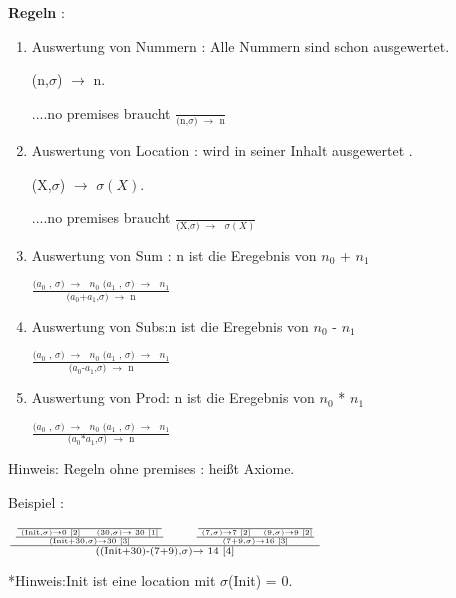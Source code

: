 \documentclass[a4paper,12pt,twoside,headsepline]{scrartcl}
\begin{document}
\textbf{Regeln} :\begin{enumerate}

\item  Auswertung von Nummern : Alle Nummern sind schon ausgewertet.\label{1}
\begin{center}
(n,$\sigma$) $\to$ n.    

 ....no premises braucht   $\frac{ } {\text{(n,$\sigma$) $\to$ n}}$
\end{center}  
\item Auswertung von Location : wird in seiner Inhalt ausgewertet .\label{2}

\begin{center}
	(X,$\sigma$) $\to$ $\sigma(X)$.    
	
	....no premises braucht    $\frac{ } {\text{(X,$\sigma$) $\to$ $\sigma(X)$}}$
\end{center} 

\item \label{3} Auswertung von Sum :  n ist die Eregebnis von $n_0$ + $n_1$

\begin{center}
	 $\frac  {\text {($a_0$ , $\sigma$) $\to$ $n_0$   ($a_1$ , $\sigma$) $\to$ $n_1$} } { \text{($a_0$+$a_1$,$\sigma$) $\to$ n} }$ 
\end{center}

\item  \label{4} Auswertung von Subs:n ist die Eregebnis von $n_0$ - $n_1$

\begin{center}
	$\frac  {\text {($a_0$ , $\sigma$) $\to$ $n_0$   ($a_1$ , $\sigma$) $\to$ $n_1$} } { \text{($a_0$-$a_1$,$\sigma$) $\to$ n} }$
	
	\end{center}

\item  \label{5} Auswertung von Prod: n ist die Eregebnis von $n_0$ * $n_1$

\begin{center}
	$\frac  {\text {($a_0$ , $\sigma$) $\to$ $n_0$   ($a_1$ , $\sigma$) $\to$ $n_1$} } { \text{($a_0$*$a_1$,$\sigma$) $\to$ n} }$
	\end{center}

\end{enumerate}   
Hinweis: Regeln ohne premises : heißt Axiome. 



Beispiel : 
\begin{center}
	$\frac{  \text{  $\frac { \text {$\frac  {}  {\text{ (Init,$\sigma$)$\to$0 $\ref{2}$ $\quad$          (30,$\sigma$)$\to$ 30 $\ref{1}$ }}$}   } {\text{(Init+30,$\sigma$)$\to$30  $\ref{3}$}}$ $\qquad$   $\frac { \text {$\frac  {}  {\text{ (7,$\sigma$)$\to$7 $ $\ref{2}$\quad$           (9,$\sigma$)$\to$9 $\ref{2}$}}$}} {\text{(7+9,$\sigma$)$\to$16 $\ref{3}$}}$  }} {\text{((Init+30)-(7+9),$\sigma$)$\to$ 14 $\ref{4}$}}$
	
	*Hinweis:Init ist eine location mit $\sigma$(Init) = 0. 
\end{center}
\end{document}
